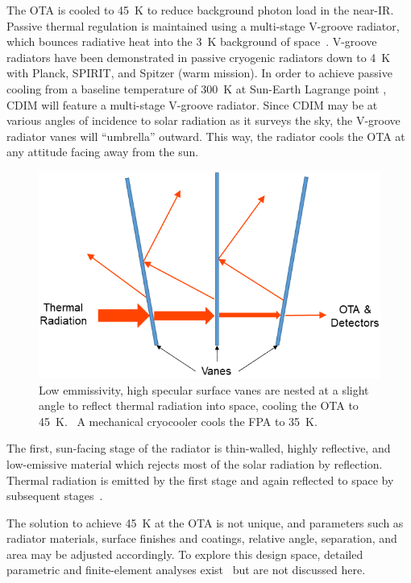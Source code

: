 \documentclass{ws-jai}
\begin{document}
The OTA is cooled to \SI{45}{\kelvin} to reduce background photon load in the near-IR.\@
Passive thermal regulation is maintained using a multi-stage V-groove radiator, which bounces radiative heat into the \SI{3}{\kelvin} background of space~\cite{bard_1987}.
V-groove radiators have been demonstrated in passive cryogenic radiators down to \SI{4}{\kelvin} with Planck, SPIRIT, and Spitzer (warm mission).\@
In order to achieve passive cooling from a baseline temperature of \SI{300}{\kelvin} at Sun-Earth Lagrange point \Ltwo, CDIM will feature a multi-stage V-groove radiator.
Since CDIM may be at various angles of incidence to solar radiation as it surveys the sky, the V-groove radiator vanes will ``umbrella'' outward.
This way, the radiator cools the OTA at any attitude facing away from the sun.

\begin{figure}[!ht]
  \centering
  \includegraphics[width=.5\linewidth]{figs/vgroove-concept2.png}
  \caption{Low emmissivity, high specular surface vanes are nested at a slight angle to reflect thermal radiation into space, cooling the OTA to \SI{45}{\kelvin}.~\cite{rasbach1988} A mechanical cryocooler cools the FPA to \SI{35}{\kelvin}.
\label{fig:v-groove}
}
\end{figure}

The first, sun-facing stage of the radiator is thin-walled, highly reflective, and low-emissive material which rejects most of the solar radiation by reflection.
Thermal radiation is emitted by the first stage and again reflected to space by subsequent stages~\cite{gilmore2003spacecraft}.

The solution to achieve \SI{45}{\kelvin} at the OTA is not unique, and parameters such as radiator materials, surface finishes and coatings, relative angle, separation, and area may be adjusted accordingly.
To explore this design space, detailed parametric and finite-element analyses exist~\cite{couto2002radiator,morgante2015echo} but are not discussed here.
\end{document}
